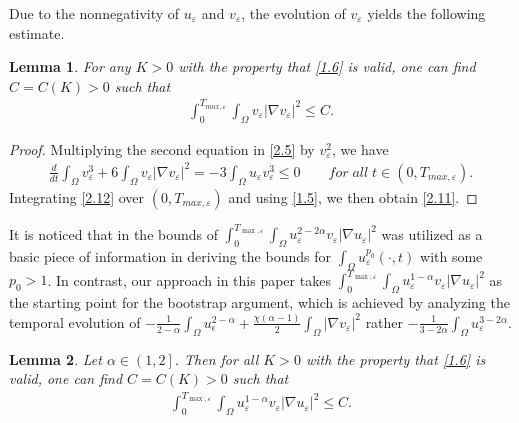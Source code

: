 \documentclass[12pt]{article}
\theoremstyle{plain}
\newtheorem{lemma}{Lemma}[section]
\theoremstyle{definition}
\numberwithin{equation}{section}
\begin{document}
Due to the nonnegativity of $u_{\varepsilon} $ and $v_{\varepsilon} $, the evolution of $v_{\varepsilon}$ yields the following estimate.
\begin{lemma}\label{lemma2.2}For any $K>0$ with the property that \eqref{1.6} is valid, one can
find $C=C(K)>0$ such that
\begin{align}\label{2.11}
    \int_0^{T_{max,\varepsilon}}\int_{\Omega}v_{\varepsilon}|\nabla v_{\varepsilon}|^2\leq C.
\end{align}
\end{lemma}
\begin{proof}
    Multiplying the second equation in \eqref{2.5} by $v_{\varepsilon}^2$, we have
    \begin{align}\label{2.12}
    \frac{d}{dt}\int_{\Omega}v_{\varepsilon}^3+6\int_{\Omega}v_{\varepsilon}|\nabla
    v_{\varepsilon}|^2=-3\int_{\Omega}u_{\varepsilon}v_{\varepsilon}^3\leq 0\qquad for\;
    all\; t\in(0,T_{max,\varepsilon}).
\end{align}
Integrating \eqref{2.12} over $(0,T_{max,\varepsilon})$ and using \eqref{1.5}, we then obtain \eqref{2.11}.
\end{proof}
It is noticed  that in  \cite{LiG} %
the bounds of $\int_0^{T_{\max, \varepsilon}}\int_{\Omega} u^{2-2\alpha}_{\varepsilon} v_{\varepsilon}|\nabla
u_{\varepsilon }|^2$ was utilized as a basic piece of information in  deriving   the bounds for $\int_\Omega u^{p_0}_\varepsilon(\cdot,t)$ with some $p_0>1$.
In contrast, our approach in this paper takes
$ \int_0^{T_{\max, \varepsilon}}\int_{\Omega} u_{\varepsilon}^{1-\alpha}v_{\varepsilon}|\nabla  u_{\varepsilon }|^2$
as the starting point for the bootstrap argument, which is achieved  by analyzing the temporal evolution of $
-\frac{1}{2-\alpha}\int_{\Omega} u_{\epsilon}^{2-\alpha}+
  \frac{\chi(\alpha-1)}{2} \int_{\Omega} |\nabla v_{\varepsilon }|^2$ rather
$-\frac{1}{3-2\alpha}\int_{\Omega}u_{\varepsilon}^{3-2\alpha}$.
\begin{lemma}\label{lemma2.3} Let $\alpha \in\left(1,2\right]$. Then for all $K>0$ with the property that
 \eqref{1.6} is valid, one can find $C=C(K)>0$ such that
\begin{align}\label{2.13}
\int_0^{T_{\max, \varepsilon}}\int_{\Omega} u_{\varepsilon}^{1-\alpha}v_{\varepsilon}|\nabla  u_{\varepsilon }|^2 \leq C  .
\end{align}
\end{lemma}
\end{document}
